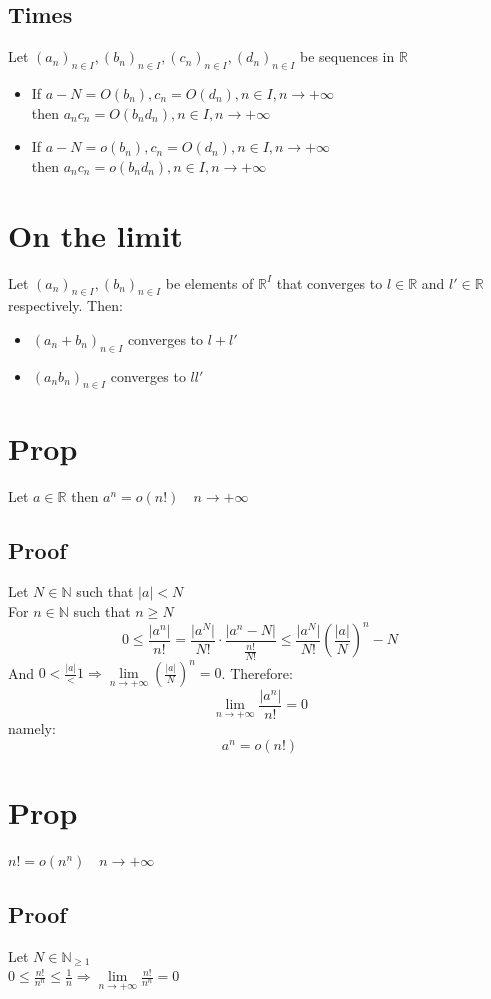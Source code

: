 \documentclass{book}
\begin{document}
\subsection{Times}
Let $(a_n)_{n\in I},(b_n)_{n\in I},(c_n)_{n\in I},(d_n)_{n\in I}$ be sequences in $\mathbb{R} $\begin{itemize}
    \item If $a-N=O(b_n),c_n=O(d_n),n\in I,n\rightarrow+\infty$\\then $a_nc_n=O(b_nd_n),n\in I,n\rightarrow+\infty$
    \item If $a-N=o(b_n),c_n=O(d_n),n\in I,n\rightarrow+\infty$\\then $a_nc_n=o(b_nd_n),n\in I,n\rightarrow+\infty$
\end{itemize}
\section{On the limit}
Let $(a_n)_{n\in I},(b_n)_{n\in I}$ be elements of $\mathbb{R}^I $ that converges to $l\in \mathbb{R} $ and $l'\in\mathbb{R} $ respectively. Then:\begin{itemize}
    \item $(a_n+b_n)_{n\in I}$ converges to $l+l'$
    \item $(a_nb_n)_{n\in I}$ converges to $ll'$
\end{itemize}
\section{Prop}Let $a\in\mathbb{R} $ then $a^n=o(n!)\quad n\rightarrow+\infty$
\subsection*{Proof}Let $N\in \mathbb{N} $ such that $\lvert a\rvert<N$\\
For $n\in\mathbb{N} $ such that $n\geq N$
$$0\leq\frac{\lvert a^n\rvert}{n!}=\frac{\lvert a^N\rvert}{N!}\cdot\frac{\lvert a^n-N\rvert}{\frac{n!}{N!}}\leq\frac{\lvert a^N\rvert}{N!}(\frac{\lvert a\rvert}{N})^n-N$$
And $0<\frac{\lvert a\rvert}<1\Rightarrow \lim\limits_{n\rightarrow+\infty}(\frac{\lvert a\rvert}{N})^n=0$. Therefore:
$$\lim\limits_{n\rightarrow+\infty}\frac{\lvert a^n\rvert}{n!}=0$$
namely:$$a^n=o(n!)$$
\section{Prop}$n!=o(n^n)\quad n\rightarrow+\infty$
\subsection*{Proof}
Let $N\in\mathbb{N} _{\geq1}$\\$0\leq\frac{n!}{n^n}\leq\frac{1}{n}\Rightarrow \lim\limits_{n\rightarrow+\infty}\frac{n!}{n^n}=0$
\end{document}
